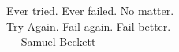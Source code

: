 \thispagestyle{empty}
{}

\vspace*{3cm}

\begin{center}
    Ever tried. Ever failed. No matter. \\
    Try Again. Fail again. Fail better. \\ \medskip
    --- Samuel Beckett    
\end{center}

\medskip

